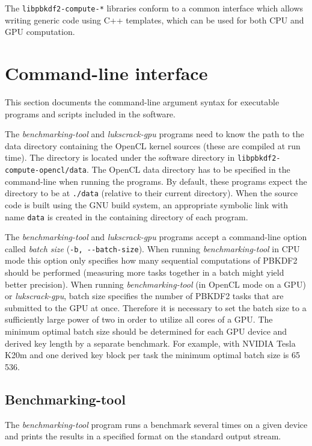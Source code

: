 \documentclass[12pt,oneside]{fithesis2}
\begin{document}
      The \verb|libpbkdf2-compute-*| libraries conform to a common interface which allows writing generic code using C++ templates, which can be used for both CPU and GPU computation. 
      
      \section{Command-line interface}
      This section documents the command-line argument syntax for executable programs and scripts included in the software.
      
      The \emph{benchmarking-tool} and \emph{lukscrack-gpu} programs need to know the path to the data directory containing the OpenCL kernel sources (these are compiled at run time). The directory is located under the software directory in \verb|libpbkdf2-compute-opencl/data|. The OpenCL data directory has to be specified in the command-line when running the programs. By default, these programs expect the directory to be at \verb|./data| (relative to their current directory). When the source code is built using the GNU build system, an appropriate symbolic link with name \verb|data| is created in the containing directory of each program.
      
      The \emph{benchmarking-tool} and \emph{lukscrack-gpu} programs accept a command-line option called \emph{batch size} (\verb|-b, --batch-size|). When running \emph{benchmarking-tool} in CPU mode this option only specifies how many sequential computations of PBKDF2 should be performed (measuring more tasks together in a batch might yield better precision). When running \emph{benchmarking-tool} (in OpenCL mode on a GPU) or \emph{lukscrack-gpu}, batch size specifies the number of PBKDF2 tasks that are submitted to the GPU at once. Therefore it is necessary to set the batch size to a sufficiently large power of two in order to utilize all cores of a GPU. The minimum optimal batch size should be determined for each GPU device and derived key length by a separate benchmark. For example, with NVIDIA Tesla K20m and one derived key block per task the minimum optimal batch size is 65\,536.
      
      \subsection{Benchmarking-tool}
      The \emph{benchmarking-tool} program runs a benchmark several times on a given device and prints the results in a specified format on the standard output stream.
      
\end{document}
